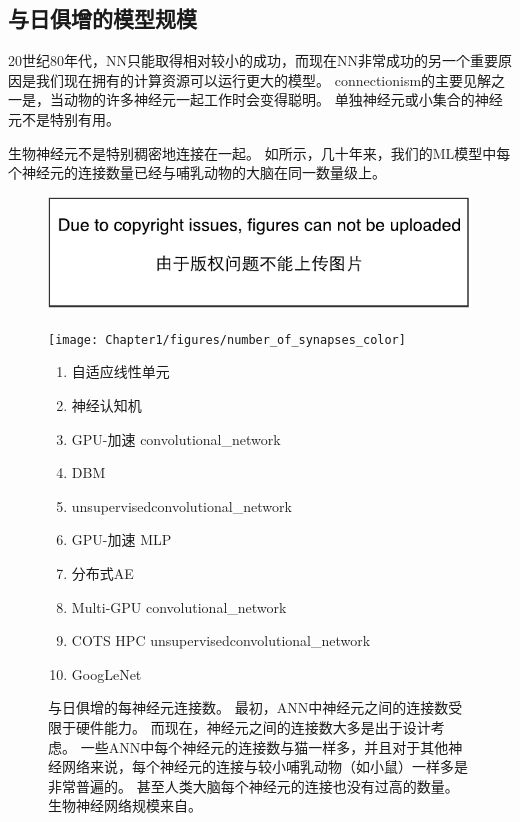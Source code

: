 
\subsection{与日俱增的模型规模}
\label{sec:increasing_model_sizes}


20世纪80年代，\gls{NN}只能取得相对较小的成功，而现在\gls{NN}非常成功的另一个重要原因是我们现在拥有的计算资源可以运行更大的模型。
\gls{connectionism}的主要见解之一是，当动物的许多神经元一起工作时会变得聪明。
单独神经元或小集合的神经元不是特别有用。

生物神经元不是特别稠密地连接在一起。
如所示，几十年来，我们的\gls{ML}模型中每个神经元的连接数量已经与哺乳动物的大脑在同一数量级上。

\begin{figure}[!htb]
\ifOpenSource
\centerline{\includegraphics{figure.pdf}}
\else
\centerline{\texttt{[image: Chapter1/figures/number\_of\_synapses\_color]}}
\fi
\caption{与日俱增的每神经元连接数。 %
最初，\gls{ANN}中神经元之间的连接数受限于硬件能力。
而现在，神经元之间的连接数大多是出于设计考虑。
一些\gls{ANN}中每个神经元的连接数与猫一样多，并且对于其他神经网络来说，每个神经元的连接与较小哺乳动物（如小鼠）一样多是非常普遍的。
甚至人类大脑每个神经元的连接也没有过高的数量。
生物神经网络规模来自\citet{number_of_neurons}。
}
\label{fig:chap1_number_of_synapses_color}
{\tiny
\begin{enumerate}
  \itemsep0em
  \item %
    自适应线性单元~\citep{Widrow60}
  \item %
    神经认知机~\citep{Fukushima80}
  \item %
    GPU-加速 \gls{convolutional_network}~\citep{chellapilla:inria-00112631}
  \item %
    \gls{DBM}~\citep{SalHinton09}
  \item %
    \gls{unsupervised}\gls{convolutional_network}~\citep{Jarrett-ICCV2009-small}
  \item %
    GPU-加速 \gls{MLP}~\citep{Ciresan-2010}
  \item %
    分布式\gls{AE}~\citep{QuocLe-ICML2012}
  \item %
    Multi-GPU \gls{convolutional_network}~\citep{Krizhevsky-2012-small}
  \item %
    COTS HPC  \gls{unsupervised}\gls{convolutional_network}~\citep{icml2013_coates13}
  \item %
    GoogLeNet~\citep{Szegedy-et-al-arxiv2014}
\end{enumerate}
} %
\end{figure}

